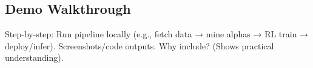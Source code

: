 \subsection{Demo Walkthrough}
\label{sec:demo}

Step-by-step: Run pipeline locally (e.g., fetch data → mine alphas → RL train → deploy/infer). Screenshots/code outputs. Why include? (Shows practical understanding).